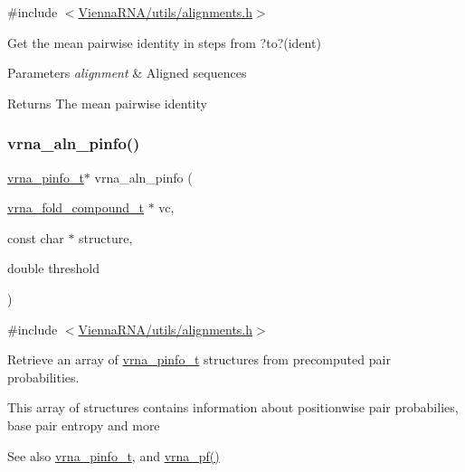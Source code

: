 {\ttfamily \#include $<$\hyperlink{utils_2alignments_8h}{Vienna\+R\+N\+A/utils/alignments.\+h}$>$}



Get the mean pairwise identity in steps from ?to?(ident) 


\begin{DoxyParams}{Parameters}
{\em alignment} & Aligned sequences \\
\hline
\end{DoxyParams}
\begin{DoxyReturn}{Returns}
The mean pairwise identity 
\end{DoxyReturn}
\mbox{\label{group__aln__utils_gaf6421a1318586c59fea6a127ed9f65f3}} 
\subsubsection{\texorpdfstring{vrna\+\_\+aln\+\_\+pinfo()}{vrna\_aln\_pinfo()}}
{\footnotesize\ttfamily \hyperlink{group__aln__utils_ga6660dfca23debee7306e0cd53341263f}{vrna\+\_\+pinfo\+\_\+t}$\ast$ vrna\+\_\+aln\+\_\+pinfo (\begin{DoxyParamCaption}\item[{\hyperlink{group__fold__compound_ga1b0cef17fd40466cef5968eaeeff6166}{vrna\+\_\+fold\+\_\+compound\+\_\+t} $\ast$}]{vc,  }\item[{const char $\ast$}]{structure,  }\item[{double}]{threshold }\end{DoxyParamCaption})}



{\ttfamily \#include $<$\hyperlink{utils_2alignments_8h}{Vienna\+R\+N\+A/utils/alignments.\+h}$>$}



Retrieve an array of \hyperlink{group__aln__utils_ga6660dfca23debee7306e0cd53341263f}{vrna\+\_\+pinfo\+\_\+t} structures from precomputed pair probabilities. 

This array of structures contains information about positionwise pair probabilies, base pair entropy and more

\begin{DoxySeeAlso}{See also}
\hyperlink{group__aln__utils_ga6660dfca23debee7306e0cd53341263f}{vrna\+\_\+pinfo\+\_\+t}, and \hyperlink{group__part__func__global_ga29e256d688ad221b78d37f427e0e99bc}{vrna\+\_\+pf()}
\end{DoxySeeAlso}

